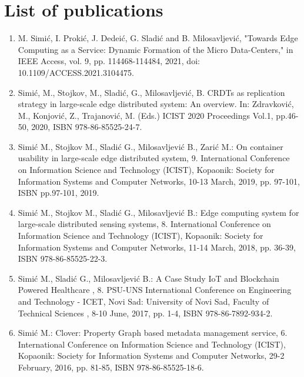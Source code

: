 \chapter*{List of publications}
%
\begin{enumerate}[start=1,label={(\bfseries \arabic*)}]
	\item M. Simić, I. Prokić, J. Dedeić, G. Sladić and B. Milosavljević, "Towards Edge Computing as a Service: Dynamic Formation of the Micro Data-Centers," in IEEE Access, vol. 9, pp. 114468-114484, 2021, doi: 10.1109/ACCESS.2021.3104475.
	\item Simić, M., Stojkov, M., Sladić, G., Milosavljević, B.  CRDTs as replication strategy in large-scale edge distributed system: An overview. In: Zdravković, M., Konjović, Z., Trajanović, M. (Eds.) ICIST 2020 Proceedings Vol.1, pp.46-50, 2020, ISBN 978-86-85525-24-7.
	\item Simić M., Stojkov M., Sladić G., Milosavljević B., Zarić M.:   On container usability in large-scale edge distributed system, 9. International Conference on Information Science and Technology (ICIST), Kopaonik: Society for Information Systems and Computer Networks, 10-13 March, 2019, pp. 97-101, ISBN pp.97-101, 2019.
	\item Simić M., Stojkov M., Sladić G., Milosavljević B.:  Edge computing system for large-scale distributed sensing systems, 8. International Conference on Information Science and Technology (ICIST), Kopaonik: Society for Information Systems and Computer Networks, 11-14 March, 2018, pp. 36-39, ISBN 978-86-85525-22-3.
	\item Simić M., Sladić G., Milosavljević B.:  A Case Study IoT and Blockchain Powered Healthcare , 8. PSU-UNS International Conference on Engineering and Technology - ICET, Novi Sad: University of Novi Sad, Faculty of Technical Sciences , 8-10 June, 2017, pp. 1-4, ISBN 978-86-7892-934-2.
	\item Simić M.:  Clover: Property Graph based metadata management service, 6. International Conference on Information Science and Technology (ICIST), Kopaonik: Society for Information Systems and Computer Networks, 29-2 February, 2016, pp. 81-85, ISBN 978-86-85525-18-6.
\end{enumerate}
%
%